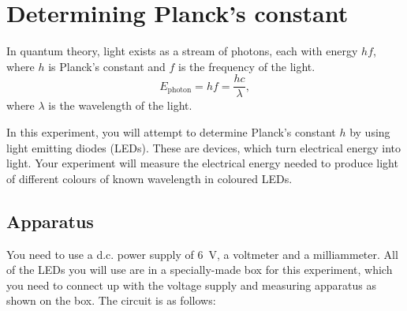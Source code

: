 \section{Determining Planck's constant}
\label{planck}

In quantum theory, light exists as a stream of photons, each with energy $hf$, where $h$ is Planck's constant and $f$ is the frequency of the light.
\[E_{\text{photon}}=hf=\frac{hc}{\lambda},\]
where $\lambda$ is the wavelength of the light.

In this experiment, you will attempt to determine Planck's constant $h$ by using light emitting diodes (LEDs).  These are devices, which turn electrical energy into light.  Your experiment will measure the electrical energy needed to produce light of different colours of known wavelength in coloured LEDs.

\subsection{Apparatus}

You need to use a d.c. power supply of \SI{6}{V}, a voltmeter and a milliammeter.  All of the LEDs you will use are in a specially-made box for this experiment, which you need to connect up with the voltage supply and measuring apparatus as shown on the box.  The circuit is as follows:\\


